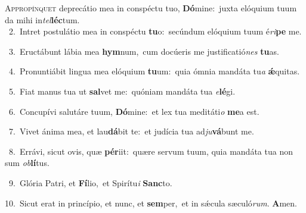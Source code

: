 \lettrine{\initial\textcolor{\initialcolor}{A}}{ppropínquet} deprecátio mea in conspéctu tuo, \textbf{Dó}\-mine:~\star juxta elóquium tuum da mihi in\-\textit{tel}\-\textbf{léc}tum.\\
{\numbfont\textcolor{\numbcolor}{~2.}}~Intret postulátio mea in conspéctu \textbf{tu}\-o:~\star secúndum elóquium tuum é\-\textit{ri}\-\textbf{pe} me.\par
{\numbfont\textcolor{\numbcolor}{~3.}}~Eructábunt lábia mea \textbf{hym}\-num,~\star cum docúeris me justificatió\textit{nes} \textbf{tu}\-as.\par
{\numbfont\textcolor{\numbcolor}{~4.}}~Pronuntiábit lingua mea elóquium \textbf{tu}\-um:~\star quia ómnia mandáta tu\textit{a} \textbf{ǽ}\-quitas.\par
{\numbfont\textcolor{\numbcolor}{~5.}}~Fiat manus tua ut \textbf{sal}\-vet me:~\star quóniam mandáta tua \textit{e}\-\textbf{lé}gi.\par
{\numbfont\textcolor{\numbcolor}{~6.}}~Concupívi salutáre tuum, \textbf{Dó}\-mine:~\star et lex tua meditáti\textit{o} \textbf{me}\-a est.\par
{\numbfont\textcolor{\numbcolor}{~7.}}~Vivet ánima mea, et lau\-\textbf{dá}\-bit te:~\star et judícia tua ad\-\textit{ju}\-\textbf{vá}bunt me.\par
{\numbfont\textcolor{\numbcolor}{~8.}}~Errávi, sicut ovis, quæ \textbf{pér}\-iit:~\star quære servum tuum, quia mandáta tua non sum \textit{ob}\-\textbf{lí}tus.\par
{\numbfont\textcolor{\numbcolor}{~9.}}~Glória Patri, et \textbf{Fí}\-lio,~\star et Spirítu\textit{i} \textbf{Sanc}\-to.\par
{\numbfont\textcolor{\numbcolor}{10.}}~Sicut erat in princípio, et nunc, et \textbf{sem}\-per,~\star et in sǽcula sæculó\-\textit{rum}\-. \textbf{A}\-men.\par
